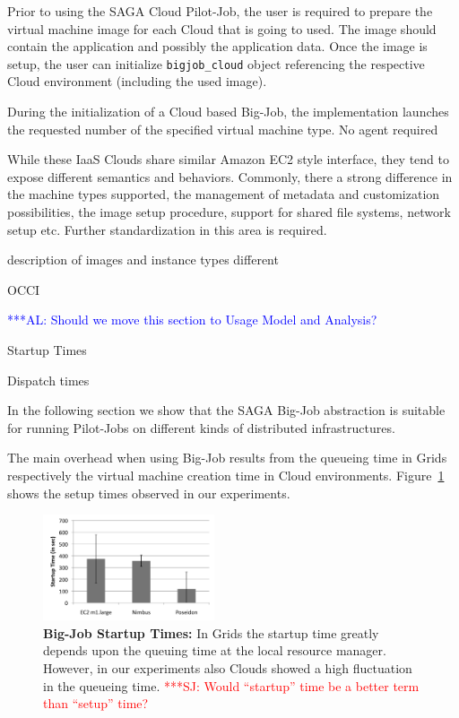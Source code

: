 \documentclass[conference,final]{IEEEtran}
\newcommand{\alnote}[1]{ {\textcolor{blue} { ***AL: #1 }}}
\newcommand{\jhanote}[1]{ {\textcolor{red} { ***SJ: #1 }}}
\newcommand{\alnote}[1]{}
\newcommand{\jhanote}[1]{}
\begin{document}
Prior to using the SAGA Cloud Pilot-Job, the user is required to
prepare the virtual machine image for each Cloud that is going to
used. The image should contain the application and possibly the
application data. Once the image is setup, the user can initialize
\texttt{bigjob\_cloud} object referencing the respective Cloud
environment (including the used image).

During the initialization of a Cloud based Big-Job, the implementation
launches the requested number of the specified virtual machine type.
No agent required

While these IaaS Clouds share similar Amazon EC2 style interface, they
tend to expose different semantics and behaviors. Commonly, there a
strong difference in the machine types supported, the management of
metadata and customization possibilities, the image setup procedure,
support for shared file systems, network setup etc. Further
standardization in this area is required.


description of images and instance types different

OCCI


\alnote{Should we move this section to Usage Model and Analysis?}

Startup Times

Dispatch times

In the following section we show that the SAGA Big-Job abstraction is
suitable for running Pilot-Jobs on different kinds of distributed
infrastructures.

The main overhead when using Big-Job results from the queueing time in Grids respectively the virtual 
machine creation time in Cloud environments. Figure~\ref{fig:performance_setup_time} shows the setup
times observed in our experiments. 
\begin{figure}[htbp]
    \centering
        \includegraphics[width=0.45\textwidth]{performance/setup_time_xls.pdf}
    \caption{\textbf{Big-Job Startup Times:} In Grids the startup time
      greatly depends upon the queuing time at the local resource
      manager. However, in our experiments also Clouds showed a high
      fluctuation in the queueing time. \jhanote{Would ``startup''
        time be a better term than ``setup'' time?}}
    \label{fig:performance_setup_time}
\end{figure}
\end{document}
